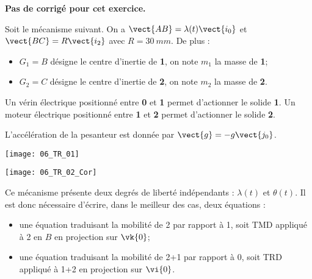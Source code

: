 \normaltrue
\correctiontrue


\setcounter{numques}{0}
\ifcorrection
\else
\textbf{Pas de corrigé pour cet exercice.}
\fi

\ifprof
\else
Soit le mécanisme suivant. On a $\vect{AB}=\lambda(t)\vect{i_0}$ et $\vect{BC}=R\vect{i_2}$ avec $R=\SI{30}{mm}$.
De plus :
\begin{itemize}
\item $G_1=B$ désigne le centre d'inertie de \textbf{1}, on note $m_1$ la masse de \textbf{1};%
\item $G_2=C$ désigne le centre d'inertie de \textbf{2}, on note $m_2$ la masse de \textbf{2}.%
\end{itemize}

Un vérin électrique positionné entre \textbf{0} et \textbf{1}  permet d'actionner le solide \textbf{1}.
Un moteur électrique positionné entre \textbf{1} et \textbf{2}  permet d'actionner le solide \textbf{2}.

L'accélération de la pesanteur est donnée par $\vect{g}=-g\vect{j_0}$.

\begin{center}
\texttt{[image: 06\_TR\_01]}
\end{center}
\fi

\ifprof
\begin{center}
\texttt{[image: 06\_TR\_02\_Cor]}
\end{center}
\else
\fi

\ifprof
Ce mécanisme présente deux degrés de liberté indépendants : $\lambda(t)$ et $\theta(t)$. Il est donc nécessaire d'écrire, dans le meilleur des cas, deux équations :
\begin{itemize}
\item une équation traduisant la mobilité de 2 par rapport à 1, soit TMD appliqué à 2 en $B$ en projection sur $\vk{0}$;
\item une équation traduisant la mobilité de 2+1 par rapport à 0, soit TRD appliqué à 1+2 en projection sur $\vi{0}$.
\end{itemize}

